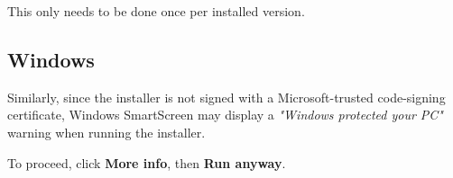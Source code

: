 \documentclass[11pt]{article}
\begin{document}
This only needs to be done once per installed version.

\subsection*{Windows}

Similarly, since the installer is not signed with a Microsoft-trusted
code-signing certificate, Windows SmartScreen may display a
\textit{"Windows protected your PC"} warning when running the installer.

To proceed, click \textbf{More info}, then \textbf{Run anyway}.
\end{document}

